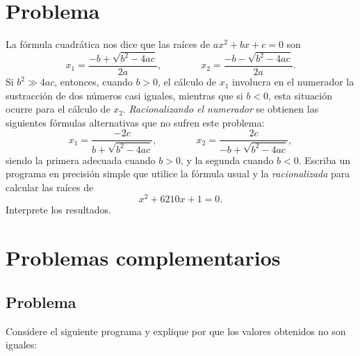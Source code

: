 \documentclass[11pt]{article}
\begin{document}
    \hypertarget{problema}{%
\section{Problema}\label{problema}}

La f\'ormula cuadr\'atica nos dice que las ra\'ices de \(ax^2 + bx + c = 0\)
son \[
x_1 = \frac{-b + \sqrt{b^2 -4ac}}{2a}, \qquad \qquad x_2 =  \frac{-b - \sqrt{b^2 -4ac}}{2a} .
\] Si \(b^2\gg 4ac\), entonces, cuando \(b>0\), el c\'alculo de \(x_1\)
involucra en el numerador la sustracci\'on de dos n\'umeros casi iguales,
mientras que si \(b<0\), esta situaci\'on ocurre para el c\'alculo de
\(x_2\). \emph{Racionalizando el numerador} se obtienen las siguientes
f\'ormulas alternativas que no sufren este problema: \[
x_1 = \frac{-2c}{b + \sqrt{b^2 -4ac}}, \qquad \qquad x_2 =  \frac{2c}{-b + \sqrt{b^2 -4ac}} ,
\] siendo la primera adecuada cuando \(b>0\), y la segunda cuando
\(b<0\). Escriba un programa en precisi\'on simple que utilice la f\'ormula
usual y la \emph{racionalizada} para calcular las ra\'ices de \[
x^2 + 6210 x + 1 = 0.
\] Interprete los resultados.

    \hypertarget{problemas-complementarios}{%
\section{Problemas complementarios}\label{problemas-complementarios}}

    \hypertarget{problema}{%
\subsection{Problema}\label{problema}}

Considere el siguiente programa y explique por que los valores obtenidos
no son iguales:
\end{document}
